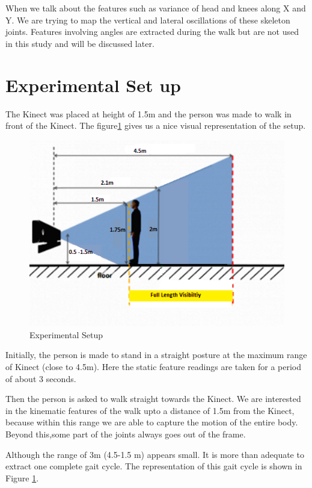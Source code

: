 \newpage
\noindent When we talk about the features such as variance of head and knees along X and Y. We are trying to map the vertical and lateral oscillations of these skeleton joints. Features involving angles are extracted during the walk but are not used in this study and will be discussed later.

\newpage
\section{Experimental Set up } \label{Experimental Set up }

\noindent The Kinect was placed at height of 1.5m and the person was made to walk in front of the Kinect. The figure\ref{fig:exp.png} gives us a nice visual  representation of the setup.\\
\begin{figure}[h]
\centering
\includegraphics[scale=0.55]{exp.png}
\caption{Experimental Setup}
\label{fig:exp.png}
\end{figure}

\noindent Initially, the person is made to stand in a straight posture at the maximum range of Kinect (close to 4.5m). Here the static feature readings are taken for a period of about 3 seconds.

\noindent Then the person is asked to walk straight towards the Kinect. We are interested in the kinematic features of the walk upto a distance of 1.5m from the Kinect, because within this range we are able to capture the motion of the entire body. Beyond this,some part of the joints always goes out of the frame.

\noindent Although the range of 3m (4.5-1.5 m) appears small. It is more than adequate to extract one complete gait cycle. The representation of this gait cycle is shown in Figure \ref{fig:exp.png}.

